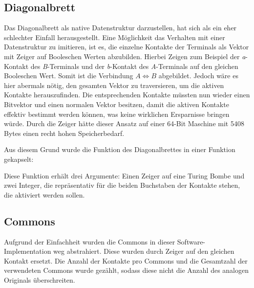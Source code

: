 \subsection{Diagonalbrett}\label{subsec:impl_diagonal_board}
Das Diagonalbrett als native Datenstruktur darzustellen, hat sich als ein eher schlechter Einfall herausgestellt.
Eine Möglichkeit das Verhalten mit einer Datenstruktur zu imitieren, ist es, die einzelne Kontakte der Terminals als Vektor mit Zeiger auf Booleschen Werten abzubilden.
Hierbei Zeigen zum Beispiel der \emph{a}-Kontakt des \emph{B}-Terminals und der \emph{b}-Kontakt des \emph{A}-Terminals auf den gleichen Booleschen Wert.
Somit ist die Verbindung $A \Leftrightarrow B$ abgebildet.
Jedoch wäre es hier abermals nötig, den gesamten Vektor zu traversieren, um die aktiven Kontakte herauszufinden.
Die entsprechenden Kontakte müssten nun wieder einen Bitvektor und einen normalen Vektor besitzen, damit die aktiven Kontakte effektiv bestimmt werden können, was keine wirklichen Ersparnisse bringen würde.
Durch die Zeiger hätte dieser Ansatz auf einer 64-Bit Maschine mit 5408 Bytes einen recht hohen Speicherbedarf.

Aus diesem Grund wurde die Funktion des Diagonalbrettes in einer Funktion gekapselt:

\noindent


Diese Funktion erhält drei Argumente: Einen Zeiger auf eine Turing Bombe und zwei Integer, die repräsentativ für die beiden Buchstaben der Kontakte stehen, die aktiviert werden sollen.

\subsection{Commons}\label{subsec:impl_commons}
Aufgrund der Einfachheit wurden die Commons in dieser Software-Implementation \glqq weg abstrahiert\grqq.
Diese wurden durch Zeiger auf den gleichen Kontakt ersetzt.
Die Anzahl der Kontakte pro Commons und die Gesamtzahl der verwendeten Commons wurde gezählt, sodass diese nicht die Anzahl des analogen Originals überschreiten.

